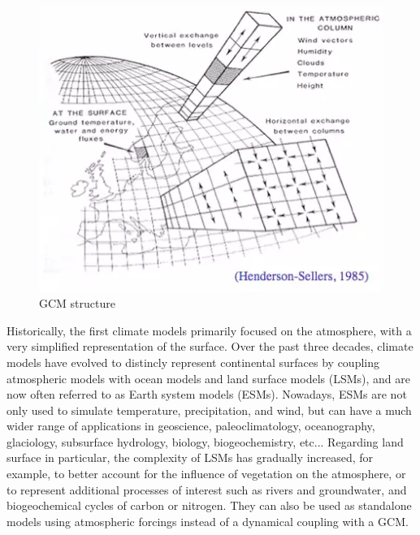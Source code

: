 \begin{figure}[ht]
    \centering
    \includegraphics[width=\textwidth]{images/GCM_structure.png}
    \caption{GCM structure %
    }
    \label{fig:GCM}
\end{figure}


Historically, the first climate models primarily focused on the atmosphere, with
a very simplified representation of the surface. Over the past three decades, climate models have evolved to distincly represent continental surfaces by coupling atmospheric models with ocean models and land surface models (LSMs), and are now often referred to as Earth system models (ESMs). Nowadays, ESMs are not only used to simulate temperature, precipitation, and wind, but can have a much wider range of applications in geoscience, paleoclimatology, oceanography, glaciology, subsurface hydrology, biology, biogeochemistry, etc... 
Regarding land surface in particular, the complexity of LSMs has gradually increased, for example, to better account for the influence of vegetation on the atmosphere, or to represent additional processes of interest such as rivers and groundwater, and biogeochemical cycles of carbon or nitrogen. They can also be used as standalone models using atmospheric forcings instead of a dynamical coupling with a GCM.



